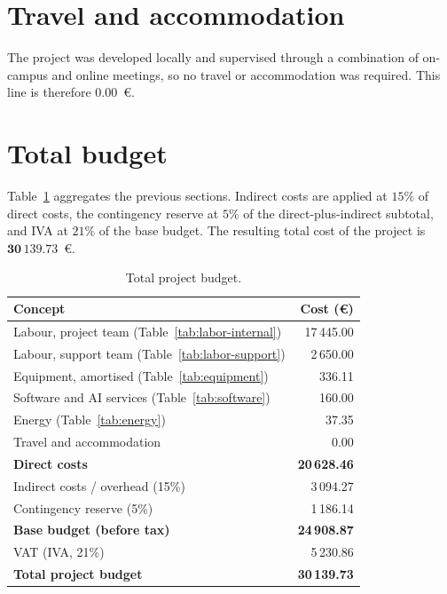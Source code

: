 \section{Travel and accommodation}\label{sec:budget-travel}

The project was developed locally and supervised through a combination of on-campus and online
meetings, so no travel or accommodation was required. This line is therefore \(0.00\)~€.

\section{Total budget}\label{sec:budget-total}

Table~\ref{tab:budget-summary} aggregates the previous sections. Indirect costs are applied at
\(15\%\) of direct costs, the contingency reserve at \(5\%\) of the direct-plus-indirect subtotal,
and IVA at \(21\%\) of the base budget. The resulting total cost of the project is
\(\mathbf{30\,139.73}\)~€.

\begin{table}[H]
  \centering
  \caption{Total project budget.}
  \label{tab:budget-summary}
  \small
  \begin{tabular}{@{}lr@{}}
    \toprule
    \textbf{Concept} & \textbf{Cost (€)} \\
    \midrule
    Labour, project team (Table~\ref{tab:labor-internal})  & 17\,445.00 \\
    Labour, support team (Table~\ref{tab:labor-support})   & 2\,650.00 \\
    Equipment, amortised (Table~\ref{tab:equipment})          & 336.11 \\
    Software and AI services (Table~\ref{tab:software})       & 160.00 \\
    Energy (Table~\ref{tab:energy})                           & 37.35 \\
    Travel and accommodation                                  & 0.00 \\
    \midrule
    \textbf{Direct costs}                                     & \textbf{20\,628.46} \\
    Indirect costs / overhead (15\%)                          & 3\,094.27 \\
    Contingency reserve (5\%)                                 & 1\,186.14 \\
    \midrule
    \textbf{Base budget (before tax)}                         & \textbf{24\,908.87} \\
    VAT (IVA, 21\%)                                            & 5\,230.86 \\
    \midrule
    \textbf{Total project budget}                             & \textbf{30\,139.73} \\
    \bottomrule
  \end{tabular}
\end{table}

